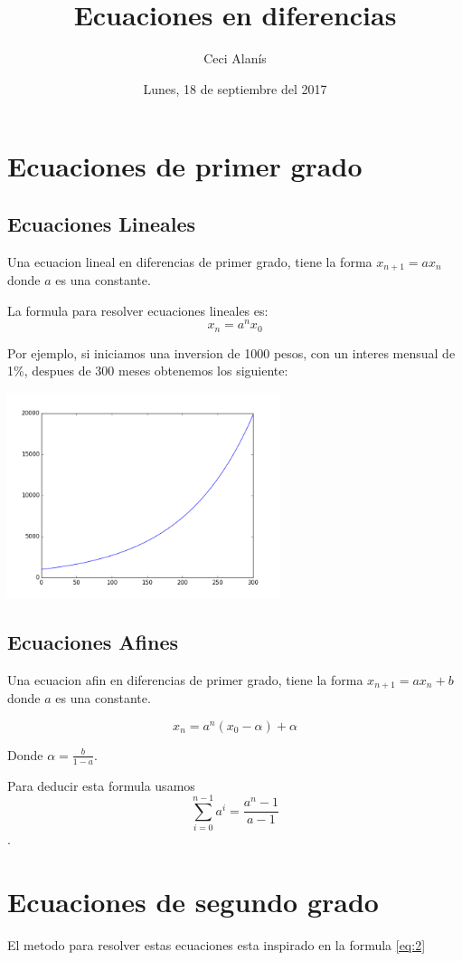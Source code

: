 \documentclass{article}
\title{Ecuaciones en diferencias}
\author{Ceci Alanís}
\date{Lunes, 18 de septiembre del 2017}
\begin{document}
\maketitle

\section{Ecuaciones de primer grado}

\subsection{Ecuaciones Lineales}

Una ecuacion lineal en diferencias de primer grado, tiene la forma $x_{n+1}=ax_n$ donde $a$ es una constante.  

La formula para resolver ecuaciones lineales es:
\begin{equation}
  \label{eq:2}
x_n=a^nx_0
\end{equation}

Por ejemplo, si iniciamos una inversion de 1000 pesos, con un interes mensual de 1\%, despues de 300 meses obtenemos los siguiente:

\begin{center}
  \includegraphics[width=8cm]{inversion.png}
\end{center}

\subsection{Ecuaciones Afines}

Una ecuacion afin en diferencias de primer grado, tiene la forma $x_{n+1}=ax_n+b $ donde $a$ es una constante.  

\begin{equation}
  \label{eq:1}
  x_n=a^n(x_0-\alpha)+ \alpha
\end{equation}

Donde $\alpha=\frac{b}{1-a}$.

Para deducir esta formula usamos $$\sum_{i=0}^{n-1}a^i= \frac{a^n-1}{a-1}$$.

\section{Ecuaciones de segundo grado}

El metodo para resolver estas ecuaciones esta inspirado en la formula \ref{eq:2}
\end{document}
